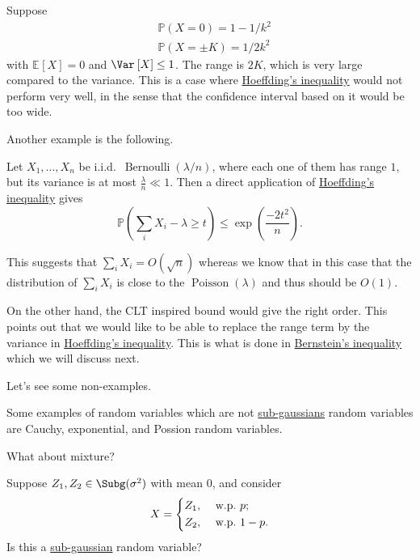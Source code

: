 \begin{eg}
  Suppose
  \[
    \begin{split}
      &\mathbb{P} (X=0) = 1 - 1/k^2\\
      &\mathbb{P} (X=\pm K) = 1/2k^2
    \end{split}
  \]
  with \(\mathbb{E}_{}\left[X \right] =0\) and \(\Var_{}\left[X \right] \leq 1\). The range is \(2K\), which is very large compared to the variance. This is a case where \hyperref[thm:Hoeffding-inequality]{Hoeffding's inequality} would not perform very well, in the sense that the confidence interval based on it would be too wide.
\end{eg}

Another example is the following.

\begin{eg}
  Let \(X_1, \dots, X_n\) be i.i.d.\ \(\mathop{\mathrm{Bernoulli}}(\lambda / n)\), where each one of them has range \(1\), but its variance is at most \(\frac{\lambda}{n} \ll 1\). Then a direct application of \hyperref[thm:Hoeffding-inequality]{Hoeffding's inequality} gives
  \[
    \mathbb{P} \left( \sum_{i} X_i - \lambda \geq t \right) \leq \exp\left( \frac{-2t^2}{n} \right) .
  \]

  This suggests that \(\sum_{i} X_i = O(\sqrt{n})\) whereas we know that in this case that the distribution of \(\sum_{i} X_i\) is close to the \(\mathop{\mathrm{Poisson}}(\lambda)\) and thus should be \(O(1)\).

  On the other hand, the CLT inspired bound would give the right order. This points out that we would like to be able to replace the range term by the variance in \hyperref[thm:Hoeffding-inequality]{Hoeffding's inequality}. This is what is done in \hyperref[thm:Bernstein-inequality]{Bernstein's inequality} which we will discuss next.
\end{eg}

Let's see some non-examples.

\begin{eg}
  Some examples of random variables which are not \hyperref[def:sub-gaussian]{sub-gaussians} random variables are Cauchy, exponential, and Possion random variables.
\end{eg}

What about mixture?

\begin{problem*}
  Suppose \(Z_1, Z_2 \in \Subg(\sigma ^{2} ) \) with mean \(0\), and consider
  \[
    X = \begin{dcases}
      Z_1, & \text{ w.p.\ } p ;   \\
      Z_2, & \text{ w.p.\ } 1-p .
    \end{dcases}
  \]
  Is this a \hyperref[def:sub-gaussian]{sub-gaussian} random variable?
\end{problem*}

